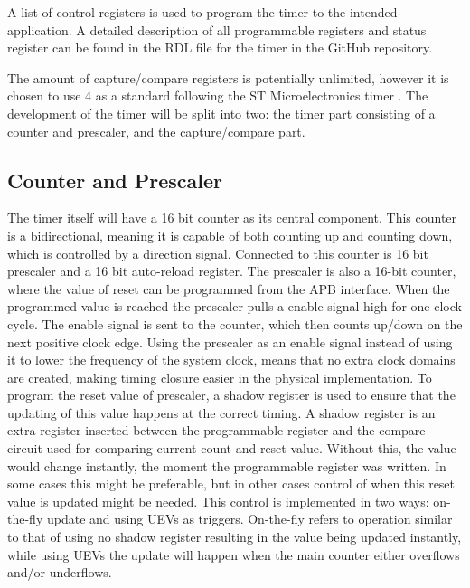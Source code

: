 \documentclass[./dissertation.tex]{subfiles}
\begin{document}
A list of control registers is used to program the timer to the intended application. A detailed description of all programmable registers and status register can be found in the RDL file for the timer in the GitHub repository.

The amount of capture/compare registers is potentially unlimited, however it is chosen to use 4 as a standard following the ST Microelectronics timer \cite{TimerManualSTM}. The development of the timer will be split into two: the timer part consisting of a counter and prescaler, and the capture/compare part.

\subsection{Counter and Prescaler}
The timer itself will have a 16 bit counter as its central component. This counter is a bidirectional, meaning it is capable of both counting up and counting down, which is controlled by a direction signal. Connected to this counter is 16 bit prescaler and a 16 bit auto-reload register. The prescaler is also a 16-bit counter, where the value of reset can be programmed from the APB interface. When the programmed value is reached the prescaler pulls a enable signal high for one clock cycle. The enable signal is sent to the counter, which then counts up/down on the next positive clock edge. Using the prescaler as an enable signal instead of using it to lower the frequency of the system clock, means that no extra clock domains are created, making timing closure easier in the physical implementation. To program the reset value of prescaler, a shadow register is used to ensure that the updating of this value happens at the correct timing. A shadow register is an extra register inserted between the programmable register and the compare circuit used for comparing current count and reset value. Without this, the value would change instantly, the moment the programmable register was written. In some cases this might be preferable, but in other cases control of when this reset value is updated might be needed. This control is implemented in two ways: on-the-fly update and using UEVs as triggers. On-the-fly refers to operation similar to that of using no shadow register resulting in the value being updated instantly, while using UEVs the update will happen when the main counter either overflows and/or underflows.
\end{document}

